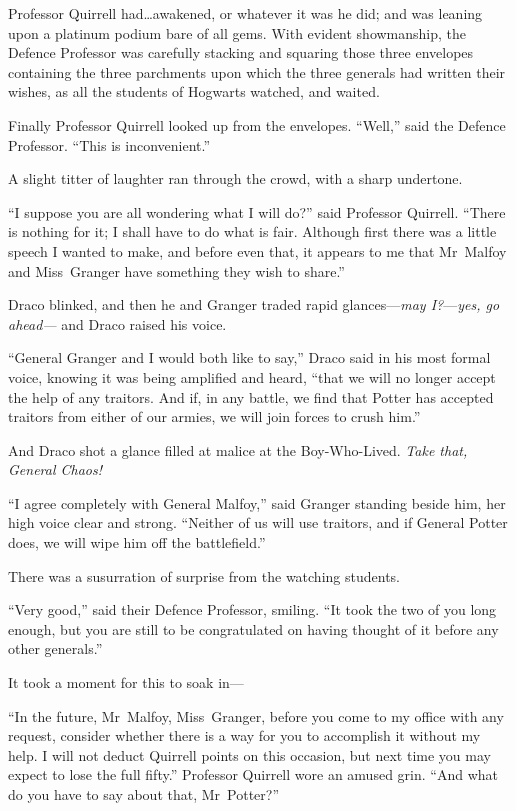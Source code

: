 Professor Quirrell had…awakened, or whatever it was he did; and was
leaning upon a platinum podium bare of all gems. With evident showmanship, the
Defence Professor was carefully stacking and squaring those three envelopes
containing the three parchments upon which the three generals had written their
wishes, as all the students of Hogwarts watched, and waited.

Finally Professor Quirrell looked up from the envelopes. “Well,” said the
Defence Professor. “This is inconvenient.”

A slight titter of laughter ran through the crowd, with a sharp undertone.

“I suppose you are all wondering what I will do?” said Professor Quirrell.
“There is nothing for it; I shall have to do what is fair. Although first there
was a little speech I wanted to make, and before even that, it appears to me
that Mr~Malfoy and Miss~Granger have something they wish to share.”

Draco blinked, and then he and Granger traded rapid glances—\emph{may
I?}—\emph{yes, go ahead—} and Draco raised his voice.

“General Granger and I would both like to say,” Draco said in his most formal
voice, knowing it was being amplified and heard, “that we will no longer accept
the help of any traitors. And if, in any battle, we find that Potter has
accepted traitors from either of our armies, we will join forces to crush him.”

And Draco shot a glance filled at malice at the Boy-Who-Lived. \emph{Take that,
General Chaos!}

“I agree completely with General Malfoy,” said Granger standing beside him, her
high voice clear and strong. “Neither of us will use traitors, and if General
Potter does, we will wipe him off the battlefield.”

There was a susurration of surprise from the watching students.

“Very good,” said their Defence Professor, smiling. “It took the two of you
long enough, but you are still to be congratulated on having thought of it
before any other generals.”

It took a moment for this to soak in—

“In the future, Mr~Malfoy, Miss~Granger, before you come to my office with any
request, consider whether there is a way for you to accomplish it without my
help. I will not deduct Quirrell points on this occasion, but next time you may
expect to lose the full fifty.” Professor Quirrell wore an amused grin. “And
what do you have to say about that, Mr~Potter?”

